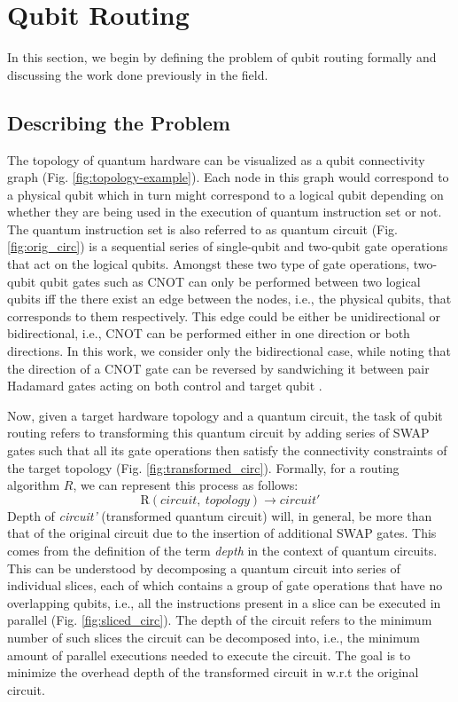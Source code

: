 \documentclass[%
 reprint,
 amsmath,amssymb,
 aps,
]{revtex4-2}
\begin{document}
\section{\label{sec:qubit-routing}Qubit Routing}
In this section, we begin by defining the problem of qubit routing formally and discussing the work done previously in the field.

\subsection{\label{sec:intro-defn}Describing the Problem}
The topology of quantum hardware can be visualized as a qubit connectivity graph (Fig. \ref{fig:topology-example}). Each node in this graph would correspond to a physical qubit which in turn might correspond to a logical qubit depending on whether they are being used in the execution of quantum instruction set or not. The quantum instruction set is also referred to as quantum circuit (Fig. \ref{fig:orig_circ}) is a sequential series of single-qubit and two-qubit gate operations that act on the logical qubits. Amongst these two type of gate operations, two-qubit qubit gates such as CNOT can only be performed between two logical qubits iff the there exist an edge between the nodes, i.e., the physical qubits, that corresponds to them respectively. This edge could be either be unidirectional or bidirectional, i.e., CNOT can be performed either in one direction or both directions. In this work, we consider only the bidirectional case, while noting that the direction of a CNOT gate can be reversed by sandwiching it between pair Hadamard gates acting on both control and target qubit \cite{}. 

Now, given a target hardware topology and a quantum circuit, the task of qubit routing refers to transforming this quantum circuit by adding series of SWAP gates such that all its gate operations then satisfy the connectivity constraints of the target topology (Fig. \ref{fig:transformed_circ}). Formally, for a routing algorithm $R$, we can represent this process as follows:
\begin{equation*}
\textrm{R}(circuit,\ topology) \rightarrow circuit'
\end{equation*}
Depth of \textit{circuit'} (transformed quantum circuit) will, in general, be more than that of the original circuit due to the insertion of additional SWAP gates. This comes from the definition of the term \textit{depth} in the context of quantum circuits. This can be understood by decomposing a quantum circuit into series of individual slices, each of which contains a group of gate operations that have no overlapping qubits, i.e., all the instructions present in a slice can be executed in parallel (Fig. \ref{fig:sliced_circ}). The depth of the circuit refers to the minimum number of such slices the circuit can be decomposed into, i.e., the minimum amount of parallel executions needed to execute the circuit. The goal is to minimize the overhead depth of the transformed circuit in w.r.t the original circuit.
\end{document}
